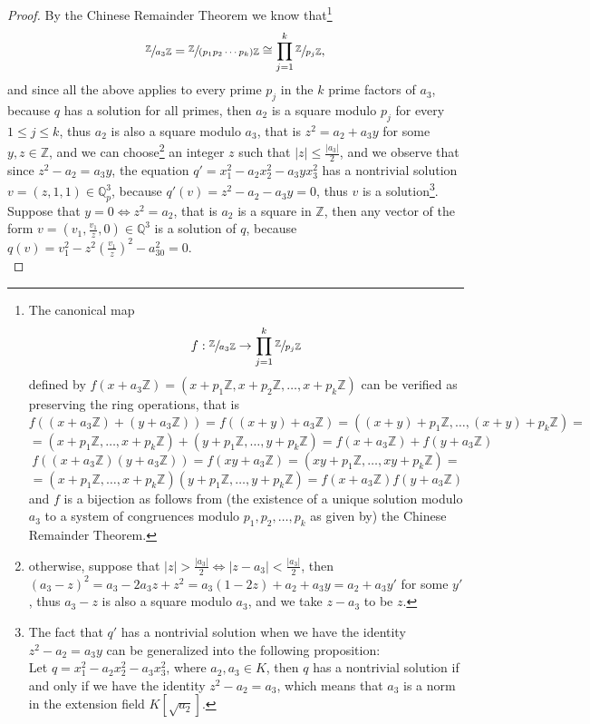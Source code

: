 \documentclass{article}
\begin{document}
\begin{proof}
\newline
By the Chinese Remainder Theorem we know that\footnote{The canonical map \[f:\sfrac{\mathbb{Z}}{a_3\mathbb{Z}}\rightarrow\prod_{j=1}^k\sfrac{\mathbb{Z}}{p_j\mathbb{Z}}\]
defined by $f(x+a_3\mathbb{Z})=(x+p_1\mathbb{Z},x+p_2\mathbb{Z},\dots,x+p_k\mathbb{Z})$ can be verified as preserving the ring operations, that is \[f\left((x+a_3\mathbb{Z})+(y+a_3\mathbb{Z})\right)=f\left((x+y)+a_3\mathbb{Z}\right)=\left((x+y)+p_1\mathbb{Z},\dots,(x+y)+p_k\mathbb{Z}\right)=\]\[=(x+p_1\mathbb{Z},\dots,x+p_k\mathbb{Z})+(y+p_1\mathbb{Z},\dots,y+p_k\mathbb{Z})=f(x+a_3\mathbb{Z})+f(y+a_3\mathbb{Z})\]
\[f\left((x+a_3\mathbb{Z})(y+a_3\mathbb{Z})\right)=f\left(xy+a_3\mathbb{Z}\right)=(xy+p_1\mathbb{Z},\dots,xy+p_k\mathbb{Z})=\]\[=(x+p_1\mathbb{Z},\dots,x+p_k\mathbb{Z})(y+p_1\mathbb{Z},\dots,y+p_k\mathbb{Z})=f(x+a_3\mathbb{Z})f(y+a_3\mathbb{Z})\]
and $f$ is a bijection as follows from (the existence of a unique solution modulo $a_3$ to a system of congruences modulo $p_1,p_2,\dots,p_k$ as given by) the Chinese Remainder Theorem.
} \[\sfrac{\mathbb{Z}}{a_3\mathbb{Z}}=\sfrac{\mathbb{Z}}{(p_1p_2\cdots{p}_k)\mathbb{Z}}\cong\prod_{j=1}^k\sfrac{\mathbb{Z}}{p_j\mathbb{Z}},\]
and since all the above applies to every prime $p_j$ in the $k$ prime factors of $a_3$, because $q$ has a solution for all primes, then $a_2$ is a square modulo $p_j$ for every $1\leq{j}\leq{k}$, thus $a_2$ is also a square modulo $a_3$, that is $z^2=a_2+a_3y$ for some $y,z\in\mathbb{Z}$, and we can choose\footnote{otherwise, suppose that $|z|>\frac{|a_3|}{2}\iff|z-a_3|<\frac{|a_3|}{2}$, then $(a_3-z)^2=a_3-2a_3z+z^2=a_3(1-2z)+a_2+a_3y=a_2+a_3y'$ for some $y'$, thus $a_3-z$ is also a square modulo $a_3$, and we take $z-a_3$ to be $z$.} an integer $z$ such that $|z|\leq\frac{|a_3|}{2}$, and we observe that since $z^2-a_2=a_3y$, the equation $q'=x_1^2-a_2x_2^2-a_3yx_3^2$ has a nontrivial solution $v=(z,1,1)\in\mathbb{Q}_p^3$, because $q'(v)=z^2-a_2-a_3y=0$, thus $v$ is a solution\footnote{The fact that $q'$ has a nontrivial solution when we have the identity $z^2-a_2=a_3y$ can be generalized into the following proposition:\\
Let $q=x_1^2-a_2x_2^2-a_3x_3^2$, where $a_2,a_3\in{K}$, then $q$ has a nontrivial solution if and only if we have the identity $z^2-a_2=a_3$, which means that $a_3$ is a norm in the extension field $K[\sqrt{a_2}]$.}.\\
\newline
Suppose that $y=0\iff{z}^2=a_2$, that is $a_2$ is a square in $\mathbb{Z}$, then any vector of the form $v=(v_1,\frac{v_1}{z},0)\in\mathbb{Q}^3$ is a solution of $q$, because $q(v)=v_1^2-z^2(\frac{v_1}{z})^2-a_30^2=0$.\\

\end{proof}
\end{document}
